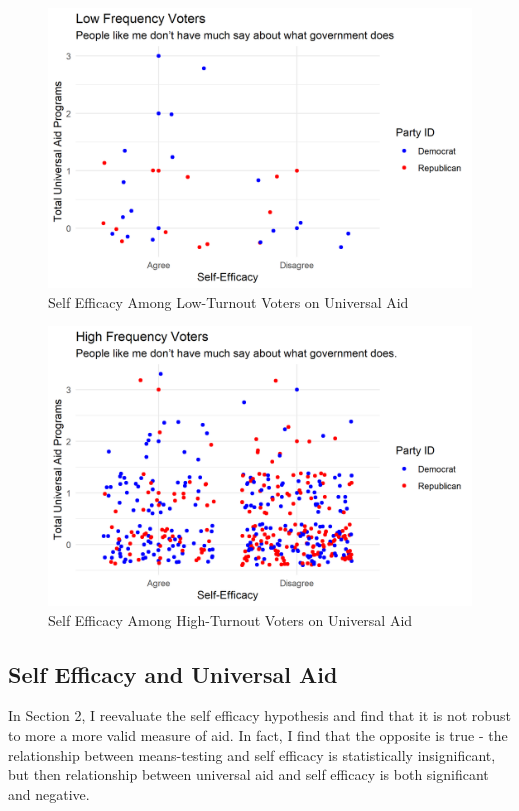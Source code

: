 \documentclass[12pt]{paper}
\begin{document}
\begin{figure}[H]
	\includegraphics[scale=0.7]{Figs/scatter_uni_efficacy_low.png} \centering
	\caption{Self Efficacy Among Low-Turnout Voters on Universal Aid}
	\label{}
\end{figure}

\begin{figure}[H]
	\includegraphics[scale=0.7]{Figs/scatter_uni_efficacy_high.png} \centering
	\caption{Self Efficacy Among High-Turnout Voters on Universal Aid}
	\label{}
\end{figure}

\subsection*{Self Efficacy and Universal Aid}
In Section 2, I reevaluate the self efficacy hypothesis and find that it is not robust to more a more valid measure of aid. In fact, I find that the opposite is true - the relationship between means-testing and self efficacy is statistically insignificant, but then relationship between universal aid and self efficacy is both significant and negative.
\end{document}
